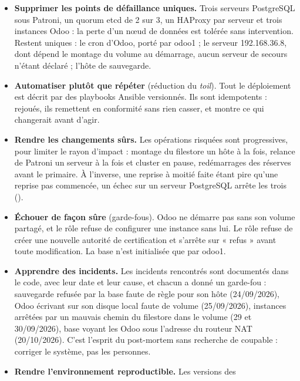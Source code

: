 \documentclass[11pt,a4paper]{article}
\newcommand{\code}[1]{\texttt{\detokenize{#1}}}
\begin{document}
\begin{itemize}
  \item \textbf{Supprimer les points de défaillance uniques.} Trois serveurs
        PostgreSQL sous Patroni, un quorum etcd de 2 sur 3, un HAProxy par
        serveur et trois instances Odoo : la perte d'un nœud de données est
        tolérée sans intervention. Restent uniques : le cron d'Odoo, porté par
        odoo1 ; le serveur 192.168.36.8, dont dépend le montage du volume au
        démarrage, aucun serveur de secours n'étant déclaré ; l'hôte de
        sauvegarde.
  \item \textbf{Automatiser plutôt que répéter} (réduction du \emph{toil}).
        Tout le déploiement est décrit par des playbooks Ansible versionnés.
        Ils sont idempotents : rejoués, ils remettent en conformité sans rien
        casser, et \code{--check --diff} montre ce qui changerait avant d'agir.
  \item \textbf{Rendre les changements sûrs.} Les opérations risquées sont
        progressives, pour limiter le rayon d'impact : montage du filestore un
        hôte à la fois, relance de Patroni un serveur à la fois et cluster en
        pause, redémarrages des réserves avant le primaire. À l'inverse, une
        reprise à moitié faite étant pire qu'une reprise pas commencée, un
        échec sur un serveur PostgreSQL arrête les trois
        (\code{any_errors_fatal}).
  \item \textbf{Échouer de façon sûre} (garde-fous). Odoo ne démarre pas sans
        son volume partagé, et le rôle \code{odoo14} refuse de configurer une
        instance sans lui. Le rôle \code{pg_ha} refuse de créer une nouvelle
        autorité de certification et s'arrête sur « refus » avant toute
        modification. La base n'est initialisée que par odoo1.
  \item \textbf{Apprendre des incidents.} Les incidents rencontrés sont
        documentés dans le code, avec leur date et leur cause, et chacun a
        donné un garde-fou : sauvegarde refusée par la base faute de règle pour
        son hôte (24/09/2026), Odoo écrivant sur son disque local faute de
        volume (25/09/2026), instances arrêtées par un mauvais chemin du
        filestore dans le volume (29 et 30/09/2026), base voyant les Odoo sous
        l'adresse du routeur NAT (20/10/2026). C'est l'esprit du post-mortem
        sans recherche de coupable : corriger le système, pas les personnes.
  \item \textbf{Rendre l'environnement reproductible.} Les versions des

\end{itemize}
\end{document}
